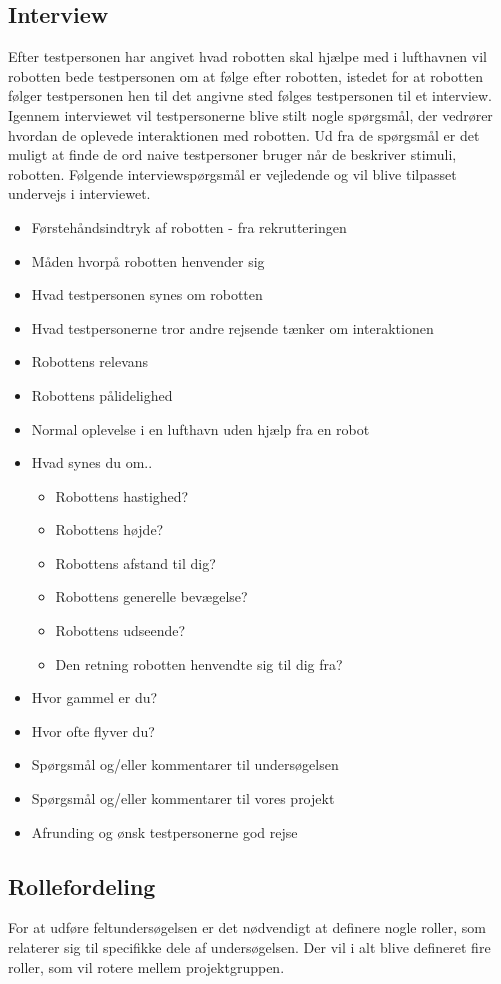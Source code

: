 \subsection*{Interview}
\label{Interview}
%
Efter testpersonen har angivet hvad robotten skal hjælpe med i lufthavnen vil robotten bede testpersonen om at følge efter robotten, istedet for at robotten følger testpersonen hen til det angivne sted følges testpersonen til et interview. Igennem interviewet vil testpersonerne blive stilt nogle spørgsmål, der vedrører hvordan de oplevede interaktionen med robotten. Ud fra de spørgsmål er det muligt at finde de ord naive testpersoner bruger når de beskriver stimuli, robotten. Følgende interviewspørgsmål er vejledende og vil blive tilpasset undervejs i interviewet. \blankline 
%
\begin{itemize}
\item Førstehåndsindtryk af robotten - fra rekrutteringen
\item Måden hvorpå robotten henvender sig
\item Hvad testpersonen synes om robotten
\item Hvad testpersonerne tror andre rejsende tænker om interaktionen 
\item Robottens relevans
\item Robottens pålidelighed
\item Normal oplevelse i en lufthavn uden hjælp fra en robot 
\item Hvad synes du om..
	\begin{itemize}
		\item Robottens hastighed?
		\item Robottens højde?
		\item Robottens afstand til dig?
		\item Robottens generelle bevægelse?
		\item Robottens udseende?
		\item Den retning robotten henvendte sig til dig fra?
	\end{itemize}
\item Hvor gammel er du?
\item Hvor ofte flyver du?
\item Spørgsmål og/eller kommentarer til undersøgelsen 
\item Spørgsmål og/eller kommentarer til vores projekt
\item Afrunding og ønsk testpersonerne god rejse
\end{itemize}
% 

\subsection*{Rollefordeling}
\label{Rollefordeling}
%
For at udføre feltundersøgelsen er det nødvendigt at definere nogle roller, som relaterer sig til specifikke dele af undersøgelsen. Der vil i alt blive defineret fire roller, som vil rotere mellem projektgruppen.
%
